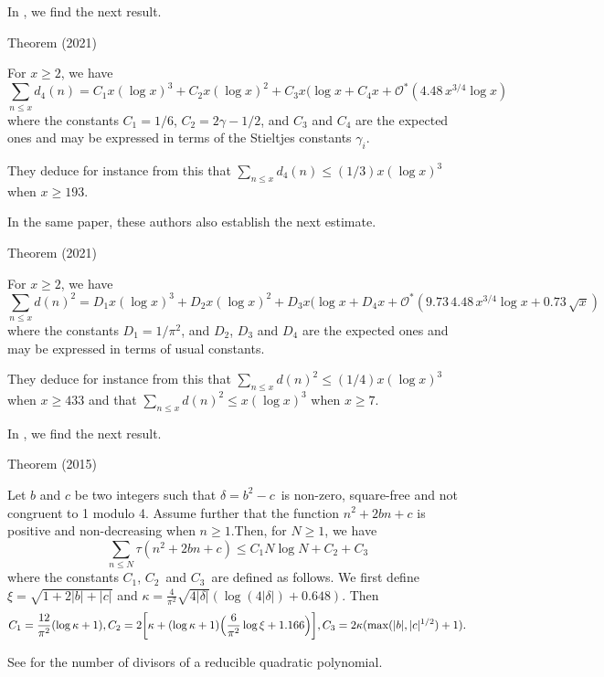 In 
\cite{Cully-Trudgian*21}, 
we find the next result.
\par 
\begin{thm}{Theorem (2021)}

  For $x\ge 2$, we have
$$
\sum_{n\le x} d_4(n) = C_1x(\log x)^3
+ C_2x(\log x)^2
+C_3x(\log x
+C_4x
+\mathcal{O}^*(4.48\,x^{3/4}\log x)
$$
where the constants $C_1=1/6$, $C_2=2\gamma-1/2$, and $C_3$ and $C_4$
  are the expected ones and may be expressed in terms of the Stieltjes
  constants $\gamma_i$.
\end{thm}

They deduce for instance from this that $\sum_{n\le
x}d_4(n)\le(1/3)x(\log x)^3$ when $x\ge 193$.

In the same paper, these authors also establish the next estimate.
\par 
\begin{thm}{Theorem (2021)}

  For $x\ge 2$, we have
$$
\sum_{n\le x} d(n)^2 = D_1x(\log x)^3
+ D_2x(\log x)^2
+D_3x(\log x
+D_4x
+\mathcal{O}^*(9.73\,4.48\,x^{3/4}\log x+0.73\,\sqrt{x})
$$
where the constants $D_1=1/\pi^2$, and $D_2$, $D_3$ and $D_4$
  are the expected ones and may be expressed in terms of usual constants.
\end{thm}

They deduce for instance from this that $\sum_{n\le
x}d(n)^2\le(1/4)x(\log x)^3$ when $x\ge 433$ and that 
$\sum_{n\le
x}d(n)^2\le x(\log x)^3$ when $x\ge 7$.

In
\cite{Lapkova*16}, we find
the next result.
\par 
\begin{thm}{Theorem (2015)}

  Let $b$ and $c$ be two integers such that $\delta=b^2-c$\, is non-zero,
  square-free and not congruent to 1 modulo 4. Assume further that the
  function $n^2+2bn+c$ is positive and non-decreasing when
  $n\ge1$.Then, for $N\ge1$, we have
  $$
  \sum_{n\le N}\tau(n^2+2bn+c)\le C_1 N\log N+C_2+C_3
  $$
  where the constants $C_1$, $C_2$\, and $C_3$\, are defined
  as follows. We first define $\xi=\sqrt{1+2|b|+|c|}$ and
  $\kappa=\frac{4}{\pi^2}\sqrt{4|\delta|}(\log(4|\delta|)+0.648)$. Then
  $$
  C_1=\frac{12}{\pi^2}(\log\kappa+1),
  C_2=2\biggl[\kappa+(\log\kappa+1)\Bigl(\frac{6}{\pi^2}\log\xi+1.166\Bigr)\biggr],
  C_3=2\kappa (\max(|b|,|c|^{1/2})+1).
  $$
\end{thm}

See
\cite{Lapkova*16-2} for the
number of divisors of a reducible quadratic polynomial.


